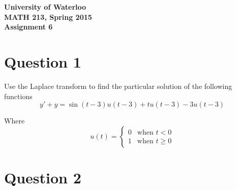 \documentclass[12pt]{article}
\begin{document}
\begin{center}
{\Large\bf University of Waterloo}\\
\vspace{3mm}
{\Large\bf MATH 213, Spring 2015}\\
\vspace{2mm}
{\Large\bf Assignment 6}\\
\end{center}

\section*{Question 1}

Use the Laplace transform to find the particular solution of the following functions
$$y' + y = \sin(t - 3)u(t - 3) + tu(t - 3) - 3u(t - 3)$$


\noindent Where
\[
 u(t) =
  \begin{cases}
    0 &\text{when } t < 0 \\
    1 &\text{when } t \ge 0
  \end{cases}
\]


\section*{Question 2}
\end{document}
